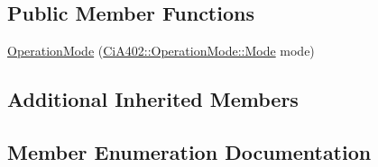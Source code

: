 \subsection*{Public Member Functions}
\begin{DoxyCompactItemize}
\item 
\hyperlink{struct_ci_a402_1_1_operation_mode_a7e379e59c52bbc8cd20957518e710a31}{Operation\+Mode} (\hyperlink{struct_ci_a402_1_1_operation_mode_a0f19a6a20de54376f05e373ae42d39ba}{Ci\+A402\+::\+Operation\+Mode\+::\+Mode} mode)
\end{DoxyCompactItemize}
\subsection*{Additional Inherited Members}


\subsection{Member Enumeration Documentation}
\hypertarget{struct_ci_a402_1_1_operation_mode_a0f19a6a20de54376f05e373ae42d39ba}{}
